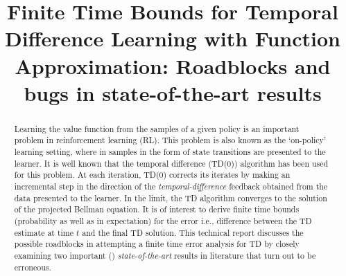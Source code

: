 \documentclass{article}
\title{Finite Time Bounds for Temporal Difference Learning with Function Approximation: Roadblocks and bugs in  state-of-the-art results}
\author{
}
\begin{document}

\maketitle
\begin{abstract}
Learning the value function from the samples of a given policy is an important problem in reinforcement learning (RL). This problem is also known as the `on-policy' learning setting, where in samples in the form of state transitions are presented to the learner. It is well known that the temporal difference (TD(0)) algorithm has been used for this problem. At each iteration, TD(0) corrects its iterates by making an incremental step in the direction of the \emph{temporal-difference} feedback obtained from the data presented to the learner. In the limit, the TD algorithm converges to the solution of the projected Bellman equation. It is of interest to derive finite time bounds (probability as well as in expectation) for the error i.e., difference between the TD estimate at time $t$ and the final TD solution. This technical report discusses the possible roadblocks in attempting a finite time error analysis for TD by closely examining two important (\cite{flstda,lstdicml}) \emph{state-of-the-art} results in literature that turn out to be erroneous.
\end{abstract}
\end{document}
